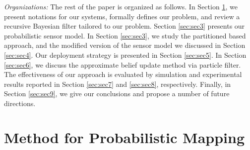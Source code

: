 \documentclass[journal]{IEEEtran}
\begin{document}
\textit{Organizations:}
The rest of the paper is organized as follows. 
In Section \ref{sec:sec2}, we present notations for our systems, formally defines our problem, and review a recursive Bayesian filter tailored to our problem.
Section \ref{sec:sec3} presents our probabilistic sensor model.
In Section \ref{sec:sec3}, we study the partitioned based approach, and the modified version of the sensor model we discussed in Section \ref{sec:sec4}. Our deployment strategy is presented in Section \ref{sec:sec5}. In Section \ref{sec:sec6}, we discuss the approximate belief update method via particle filter.
The effectiveness of our approach is evaluated by simulation and experimental results reported in Section \ref{sec:sec7} and \ref{sec:sec8}, respectively.
Finally, in Section \ref{sec:sec9}, we give our conclusions and propose a number of future directions.





\section{Method for Probabilistic Mapping}
\label{sec:sec2}
\end{document}
